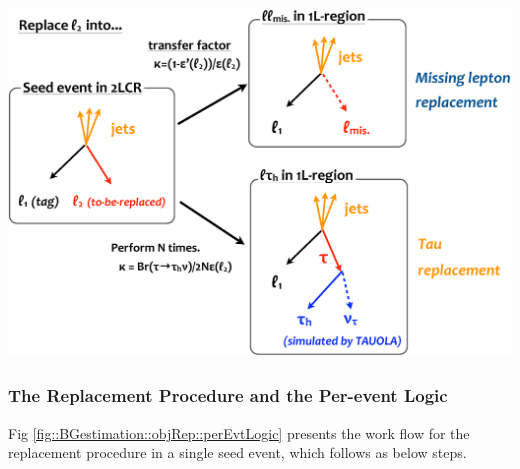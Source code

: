 \includegraphics[width=160mm]{figures/BGestimation/ObjReplacement/method/schematic_replacement.eps}
\label{fig::BGestimation::objRep::schematic1}

\clearpage
\subsubsection{The Replacement Procedure and the Per-event Logic} \label{sec::BGestimation::objRep::perEvtLogic}
Fig \ref{fig::BGestimation::objRep::perEvtLogic} presents the work flow for the replacement procedure in a single seed event, which follows as below steps. \\

